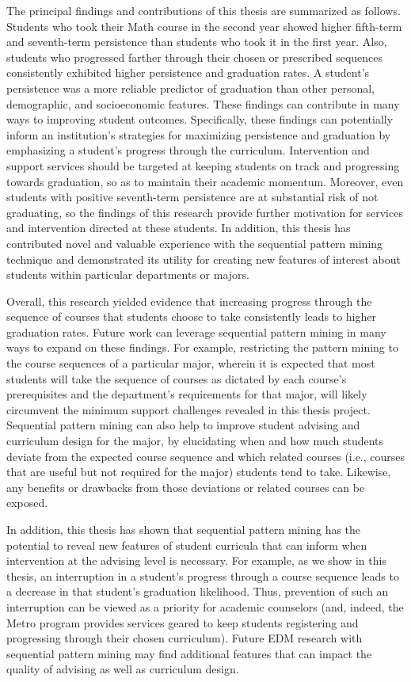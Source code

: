 The principal findings and contributions of this thesis are summarized as follows.  Students who took their Math course in the second year showed higher fifth-term and seventh-term persistence than students who took it in the first year.  Also, students who progressed farther through their chosen or prescribed sequences consistently exhibited higher persistence and graduation rates.  A student's persistence was a more reliable predictor of graduation than other personal, demographic, and socioeconomic features.  These findings can contribute in many ways to improving student outcomes.  Specifically, these findings can potentially inform an institution's strategies for maximizing persistence and graduation by emphasizing a student's progress through the curriculum.  Intervention and support services should be targeted at keeping students on track and progressing towards graduation, so as to maintain their academic momentum.  Moreover, even students with positive seventh-term persistence are at substantial risk of not graduating, so the findings of this research provide further motivation for services and intervention directed at these students.  In addition, this thesis has contributed novel and valuable experience with the sequential pattern mining technique and demonstrated its utility for creating new features of interest about students within particular departments or majors.  

Overall, this research yielded evidence that increasing progress through the sequence of courses that students choose to take consistently leads to higher graduation rates.  Future work can leverage sequential pattern mining in many ways to expand on these findings.  For example, restricting the pattern mining to the course sequences of a particular major, wherein it is expected that most students will take the sequence of courses as dictated by each course's prerequisites and the department's requirements for that major, will likely circumvent the minimum support challenges revealed in this thesis project.  Sequential pattern mining can also help to improve student advising and curriculum design for the major, by elucidating when and how much students deviate from the expected course sequence and which related courses (i.e., courses that are useful but not required for the major) students tend to take.  Likewise, any benefits or drawbacks from those deviations or related courses can be exposed.  

In addition, this thesis has shown that sequential pattern mining has the potential to reveal new features of student curricula that can inform when intervention at the advising level is necessary.  For example, as we show in this thesis, an interruption in a student's progress through a course sequence leads to a decrease in that student's graduation likelihood.  Thus, prevention of such an interruption can be viewed as a priority for academic counselors (and, indeed, the Metro program provides services geared to keep students registering and progressing through their chosen curriculum).  Future EDM research with sequential pattern mining may find additional features that can impact the quality of advising as well as curriculum design.
